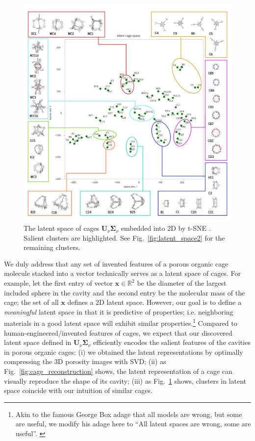 \documentclass[journal=jacsat,manuscript=article,layout=traditional]{achemso}
\begin{document}
\begin{figure}
\centering
	\includegraphics[width=\columnwidth]{../latent_cage_space_2D_marked_main.png}
	\caption{The latent space of cages $\mathbf{U}_\nu \mathbf{\Sigma}_\nu$ embedded into 2D by t-SNE \cite{maaten2008visualizing,wattenberg2016how}. Salient clusters are highlighted. See Fig.~\ref{fig:latent_space2} for the remaining clusters.
	} \label{fig:latent_space}
\end{figure}

We duly address that any set of invented features of a porous organic cage molecule stacked into a vector technically serves as a latent space of cages. For example, let the first entry of vector $\mathbf{x}\in \mathbb{R}^2$ be the diameter of the largest included sphere in the cavity and the second entry be the molecular mass of the cage; the set of all $\mathbf{x}$ defines a 2D latent space. However, our goal is to define a \emph{meaningful} latent space in that it is predictive of properties; i.e. neighboring materials in a good latent space will exhibit similar properties.\footnote[3]{Akin to the famous George Box adage that all models are wrong, but some are useful, we modify his adage here to ``All latent spaces are wrong, some are useful''. \cite{box1976science}} Compared to human-engineered/invented features of cages, we expect that our discovered latent space defined in $\mathbf{U}_\nu \mathbf{\Sigma}_\nu$ efficiently encodes the salient features of the cavities in porous organic cages: (i) we obtained the latent representations by optimally compressing the 3D porosity images with SVD; (ii) as Fig.~\ref{fig:cage_reconstruction} shows, the latent representation of a cage can visually reproduce the shape of its cavity; (iii) as Fig.~\ref{fig:latent_space} shows, clusters in latent space coincide with our intuition of similar cages. 
\end{document}
